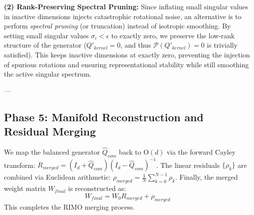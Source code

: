 \textbf{(2) Rank-Preserving Spectral Pruning:} Since inflating small singular values in inactive dimensions injects catastrophic rotational noise, an alternative is to perform \emph{spectral pruning} (or truncation) instead of isotropic smoothing. By setting small singular values $\sigma_i < \epsilon$ to exactly zero, we preserve the low-rank structure of the generator ($Q'_{kernel} = 0$, and thus $\mathcal{P}(Q'_{kernel}) = 0$ is trivially satisfied). This keeps inactive dimensions at exactly zero, preventing the injection of spurious rotations and ensuring representational stability while still smoothing the active singular spectrum.

---

\subsection{Phase 5: Manifold Reconstruction and Residual Merging}
We map the balanced generator $\hat{Q}_{com}$ back to $\mathrm{O}(d)$ via the forward Cayley transform: $R_{merged} = (I_d + \hat{Q}_{com})(I_d - \hat{Q}_{com})^{-1}$. The linear residuals $\{\rho_k\}$ are combined via Euclidean arithmetic: $\rho_{merged} = \frac{1}{N} \sum_{k=0}^{N-1} \rho_k$. Finally, the merged weight matrix $W_{final}$ is reconstructed as:
\begin{equation}
W_{final} = W_0 R_{merged} + \rho_{merged}
\end{equation}
This completes the RIMO merging process.
